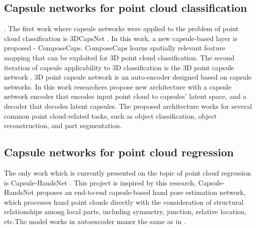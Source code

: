 \subsection{Capsule networks for point cloud classification}. The first work where capsule networks were applied to the problem of point cloud classification is 3DCapsNet \parencite{cheraghian_3dcapsule_2018}. In this work, a new capsule-based layer is proposed - ComposeCaps. ComposeCaps learns spatially relevant feature mapping that can be exploited for 3D point cloud classification.
The second iteration of capsule applicability to 3D classification is the 3D point capsule network \parencite{zhao_3d_2019}. 3D point capsule network is an auto-encoder designed based on capsule networks. In this work researchers propose new architecture with a capsule network encoder that encodes input point cloud to capsules' latent space, and a decoder that decodes latent capsules. The proposed architecture works for several common point cloud-related tasks, such as object classification, object reconstruction, and part segmentation.

\subsection{Capsule networks for point cloud regression} 
The only work which is currently presented on the topic of point cloud regression is Capsule-HandsNet \parencite{wu_3d_2020}. This project is inspired by this research. Capsule-HandsNet proposes an end-to-end capsule-based hand pose estimation network, which processes hand point clouds directly with the consideration of structural relationships among local parts, including symmetry, junction, relative location, etc.The model works in autoencoder maner the same as in \parencite{zhao_3d_2019}.
